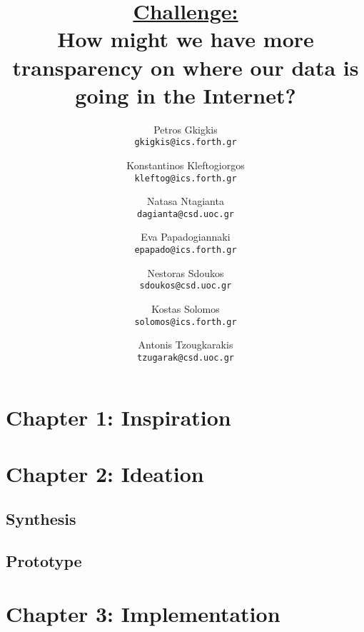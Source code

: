 \documentclass[11pt, a4paper]{article}
\title{\Large \bf \underline{Challenge:}\\
How might we have more transparency on where our data is going in the Internet?\\}
\author{
	Petros Gkigkis\\
	\texttt{gkigkis@ics.forth.gr}\\
	\and
  	Konstantinos Kleftogiorgos\\
	\texttt{kleftog@ics.forth.gr}\\
	\and
	Natasa Ntagianta\\
	\texttt{dagianta@csd.uoc.gr}\\
  	\and
	Eva Papadogiannaki\\
  	\texttt{epapado@ics.forth.gr}\\
	\and
	Nestoras Sdoukos\\
	\texttt{sdoukos@csd.uoc.gr}\\
	\and
	Kostas Solomos\\
	\texttt{solomos@ics.forth.gr}\\
	\and
	Antonis Tzougkarakis\\
	\texttt{tzugarak@csd.uoc.gr}\\
}
\date{}
\begin{document}
	\maketitle
	\newpage

	\section{Chapter 1: Inspiration}
	
	

	\section{Chapter 2: Ideation}
	\subsection{Synthesis}
	
	
	
	\subsection{Prototype}
	
	
	
	
	
	
	
	
	
	
	\section{Chapter 3: Implementation}
	
	

	

        
        
\end{document}
